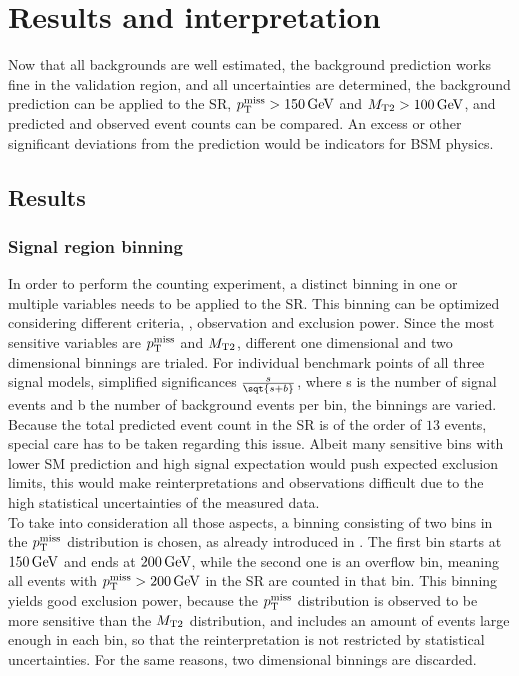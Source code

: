 \chapter{Results and interpretation}\label{chap:results}
\minitoc
Now that all backgrounds are well estimated, the background prediction works fine in the validation region, and all uncertainties are determined, the background prediction can be applied to the SR, $p_{\mathrm{T}}^\text{miss}>150\,\text{Ge\hspace{-.08em}V}$ and $M_{\mathrm{T2}}>100\,\text{Ge\hspace{-.08em}V}$, and predicted and observed event counts can be compared. An excess or other significant deviations from the prediction would be indicators for BSM physics.
\section{Results}\label{sec:results}
\subsection*{Signal region binning}
In order to perform the counting experiment, a distinct binning in one or multiple variables needs to be applied to the SR. This binning can be optimized considering different criteria, \eg, observation and exclusion power. Since the most sensitive variables are $p_{\mathrm{T}}^\text{miss}$ and $M_{\mathrm{T2}}$, different one dimensional and two dimensional binnings are trialed. For individual benchmark points of all three signal models, simplified significances $\frac{s}{\sqt{s+b}}$, where s is the number of signal events and b the number of background events per bin, the binnings are varied. Because the total predicted event count in the SR is of the order of $13$ events, special care has to be taken regarding this issue. Albeit many sensitive bins with lower SM prediction and high signal expectation would push expected exclusion limits, this would make reinterpretations and observations difficult due to the high statistical uncertainties of the measured data.\\
To take into consideration all those aspects, a binning consisting of two bins in the $p_{\mathrm{T}}^\text{miss}$ distribution is chosen, as already introduced in . The first bin starts at $150\,\text{Ge\hspace{-.08em}V}$ and ends at $200\,\text{Ge\hspace{-.08em}V}$, while the second one is an overflow bin, meaning all events with $p_{\mathrm{T}}^\text{miss}>200\,\text{Ge\hspace{-.08em}V}$ in the SR are counted in that bin. This binning yields good exclusion power, because the $p_{\mathrm{T}}^\text{miss}$ distribution is observed to be more sensitive than the $M_{\mathrm{T2}}$ distribution, and includes an amount of events large enough in each bin, so that the reinterpretation is not restricted by statistical uncertainties. For the same reasons, two dimensional binnings are discarded.
